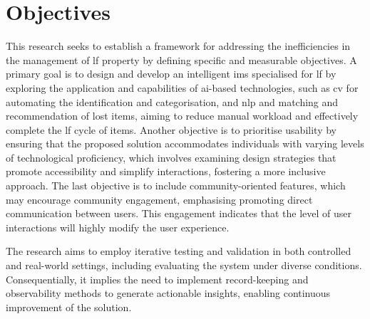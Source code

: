 \section{Objectives} \label{section:objectives}

This research seeks to establish a framework for addressing the inefficiencies in the management of \ac{lf} property by defining specific and measurable objectives. A primary goal is to design and develop an intelligent \ac{ims} specialised for \ac{lf} by exploring the application and capabilities of \ac{ai}-based technologies, such as \ac{cv} for automating the identification and categorisation, and \ac{nlp} and matching and recommendation of lost items, aiming to reduce manual workload and effectively complete the \ac{lf} cycle of items. Another objective is to prioritise usability by ensuring that the proposed solution accommodates individuals with varying levels of technological proficiency, which involves examining design strategies that promote accessibility and simplify interactions, fostering a more inclusive approach. The last objective is to include community-oriented features, which may encourage community engagement, emphasising promoting direct communication between users. This engagement indicates that the level of user interactions will highly modify the user experience.

The research aims to employ iterative testing and validation in both controlled and real-world settings, including evaluating the system under diverse conditions. Consequentially, it implies the need to implement record-keeping and observability methods to generate actionable insights, enabling continuous improvement of the solution.



